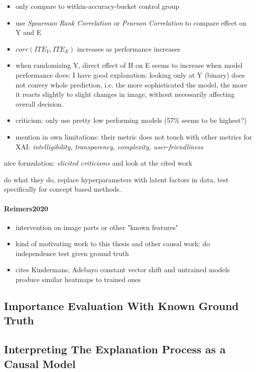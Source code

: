 \begin{itemize}
    \item only compare to within-accuracy-bucket control group
    \item use \textit{Spearman Rank Correlation} or \textit{Pearson Correlation} to compare effect on Y and E
    \item $corr(ITE_Y, ITE_E)$ increases as performance increases
    \item when randomizing Y, direct effect of H on E seems to increase when model performance does: I have good explanation: looking only at Y (binary) does not convey whole prediction, i.e. the more sophisticated the model, the more it reacts slightly to slight changes in image, without necessarily affecting overall decision.
    \item criticism: only use pretty low performing models (57\% seems to be highest?)
    \item mention in own limitations: their metric does not touch with other metrics for XAI: \textit{intelligibility, transparency, complexity, user-friendliness}
    
    
\end{itemize}

nice formulation: \textit{elicited criticisms} and look at the cited work

do what they do, replace hyperparameters with latent factors in data, test specifically for concept based methods. 

\paragraph*{Reimers2020}
\cite{Reimers2020}
\begin{itemize}
      \item intervention on image parts or other "known features"
      \item kind of motivating work to this thesis and other causal work: do independence test given ground truth 
      \item cites Kindermans, Adebayo constant vector shift and untrained models produce similar heatmaps to trained ones
\end{itemize}

\subsection{Importance Evaluation With Known Ground Truth}

\subsection{Interpreting The Explanation Process as a Causal Model}

 


